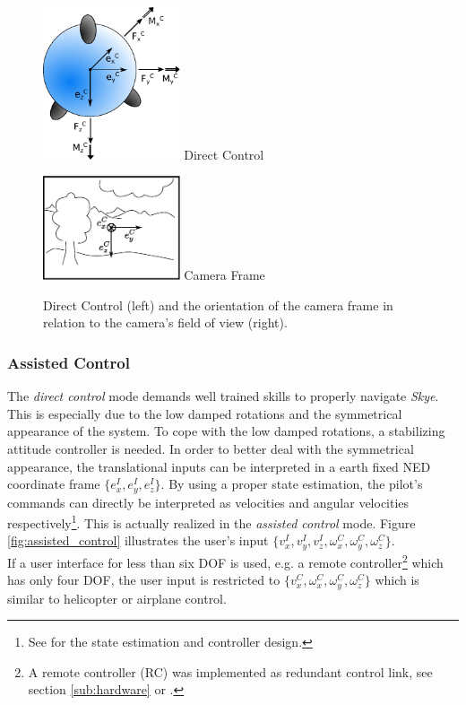 \begin{figure}[H]		
	\small{
		\begin{center}
			\parbox{0.36\textwidth}{\centering \includegraphics[width=0.36\textwidth]{DC}
			 Direct Control}
			\hspace{0.1\textwidth}			
			\parbox{0.36\textwidth}{\centering \includegraphics[width=0.36\textwidth]{CameraFrame}
			Camera Frame}
	\caption[Assisted Control]{Direct Control (left) and the orientation of the camera frame in relation to the camera's field of view (right).}
		\label{fig:direct_control}
		\end{center}
	}			
	\vspace{4.5mm}
\end{figure}


\subsubsection{Assisted Control} 
The \textit{direct control} mode demands well trained skills to properly navigate \textit{Skye}. This is especially due to the low damped rotations \cite{weichart} and the symmetrical appearance of the system. To cope with the low damped rotations, a stabilizing attitude controller is needed. In order to better deal with the symmetrical appearance, the translational inputs can be interpreted in a earth fixed NED coordinate frame $\{e_x^I, e_y^I, e_z^I\}$. By using a proper state estimation, the pilot's commands can directly be interpreted as velocities and angular velocities respectively\footnote{See \cite{meiermueri} for the state estimation and controller design.}. This is actually realized in the \textit{assisted control} mode. Figure \ref{fig:assisted_control} illustrates the user's input $\{v_x^I, v_y^I, v_z^I, \omega_x^C, \omega_y^C, \omega_z^C\}$. \\
If a user interface for less than six DOF is used, e.g. a remote controller\footnote{A remote controller (RC) was implemented as redundant control link, see section \ref{sub:hardware} or \cite{burri}.} which has only four DOF, the user input is restricted to $\{v_x^C, \omega_x^C, \omega_y^C, \omega_z^C\}$ which is similar to helicopter or airplane control.

